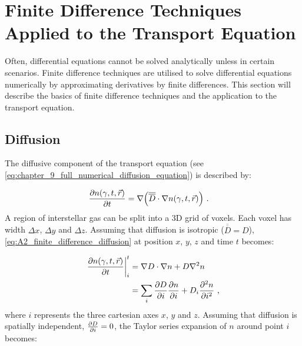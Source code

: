 \chapter[Finite Difference Techniques]{Finite Difference Techniques Applied to the Transport Equation} \label{sec:A2_finite_difference}

Often, differential equations cannot be solved analytically unless in certain scenarios. Finite difference techniques are utilised to solve differential equations numerically by approximating derivatives by finite differences. This section will describe the basics of finite difference techniques and the application to the transport equation.

\section{Diffusion} \label{sec:A2_diffusion}

The diffusive component of the transport equation (see \autoref{eq:chapter_9_full_numerical_diffusion_equation}) is described by:

\begin{equation}
    \begin{aligned}
    \pdv{n\qty(\gamma,t,\vec{r})}{t}&=\nabla \qty(\overline{\overline{D}}\cdot\nabla n\qty(\gamma,t,\vec{r}))\text{ .} 
    \end{aligned} \label{eq:A2_finite_difference_diffusion}
\end{equation}
\noindent A region of interstellar gas can be split into a 3D grid of voxels. Each voxel has width $\Delta x$, $\Delta y$ and $\Delta z$. Assuming that diffusion is isotropic ($\overline{\overline{D}}=D$), \autoref{eq:A2_finite_difference_diffusion} at position $x$, $y$, $z$ and time $t$ becomes:

\begin{equation}
    \begin{aligned}
    \pdv{n\qty(\gamma,t,\vec{r})}{t}\bigg|_{i}^t &= \nabla D\cdot\nabla n + D\nabla^2 n \\
    &= \sum_{i} \pdv{D}{i}\pdv{n}{i}+ D_i\pdv[2]{n}{i}\text{ ,} 
    \end{aligned} \label{eq:A2_finite_difference_diffusion_expanded}
\end{equation}
\noindent where $i$ represents the three cartesian axes $x$, $y$ and $z$. Assuming that diffusion is spatially independent, $\pdv{D}{i}=0$, the Taylor series expansion of $n$ around point $i$ becomes:

